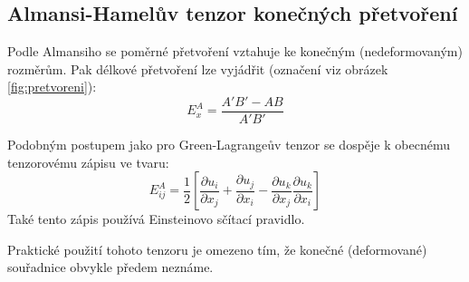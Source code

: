 
\subsection{Almansi-Hamelův tenzor konečných přetvoření}
Podle Almansiho se poměrné přetvoření vztahuje ke konečným (nedeformovaným) rozměrům. Pak délkové přetvoření lze vyjádřit (označení viz obrázek \ref{fig:pretvoreni}):
\begin{equation}
	E^A_x = \frac{A'B' - AB}{A'B'}
\end{equation}

Podobným postupem jako pro Green-Lagrangeův tenzor se dospěje k obecnému tenzorovému zápisu ve tvaru:
\begin{equation}
	E^A_{ij}
	= \frac{1}{2} \left[ \frac{\partial u_i}{\partial x_j} + \frac{\partial u_j}{\partial x_i} - \frac{\partial u_k}{\partial x_j} \frac{\partial u_k}{\partial x_i} \right]
\end{equation}
Také tento zápis používá Einsteinovo sčítací pravidlo.

Praktické použití tohoto tenzoru je omezeno tím, že konečné (deformované) souřadnice obvykle předem neznáme.
